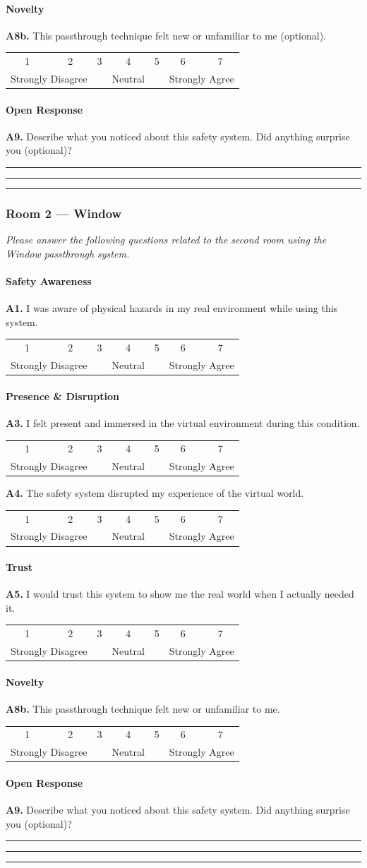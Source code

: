\documentclass{styling/vgtc} %
\makeatletter
\newcommand{\likert}{%
  \par\smallskip
  \begin{center}\small
  \begin{tabular}{@{}ccccccc@{}}
    1 & 2 & 3 & 4 & 5 & 6 & 7 \\[-2pt]
    \multicolumn{2}{l}{\scriptsize Strongly Disagree} &
    & {\scriptsize Neutral} &
    & \multicolumn{2}{r}{\scriptsize Strongly Agree}
  \end{tabular}
  \end{center}\smallskip\noindent}
\newcommand{\answerlines}{%
  \par\vspace{4pt}%
  \noindent\rule{\linewidth}{0.3pt}\par\vspace{10pt}%
  \noindent\rule{\linewidth}{0.3pt}\par\vspace{10pt}%
  \noindent\rule{\linewidth}{0.3pt}\par\vspace{6pt}}
\makeatother
\begin{document}
\paragraph{Novelty}
\noindent\textbf{A8b.} This passthrough technique felt new or unfamiliar to me (optional).\likert

\paragraph{Open Response}
\noindent\textbf{A9.} Describe what you noticed about this safety system. Did anything surprise you (optional)?\answerlines

\subsubsection*{Room 2 --- Window}

\noindent\textit{Please answer the following questions related to the second room using the Window passthrough system.}

\paragraph{Safety Awareness}
\noindent\textbf{A1.} I was aware of physical hazards in my real environment while using this system.\likert

\paragraph{Presence \& Disruption}
\noindent\textbf{A3.} I felt present and immersed in the virtual environment during this condition.\likert

\noindent\textbf{A4.} The safety system disrupted my experience of the virtual world.\likert

\paragraph{Trust}
\noindent\textbf{A5.} I would trust this system to show me the real world when I actually needed it.\likert

\paragraph{Novelty}
\noindent\textbf{A8b.} This passthrough technique felt new or unfamiliar to me.\likert

\paragraph{Open Response}
\noindent\textbf{A9.} Describe what you noticed about this safety system. Did anything surprise you (optional)?\answerlines
\end{document}
